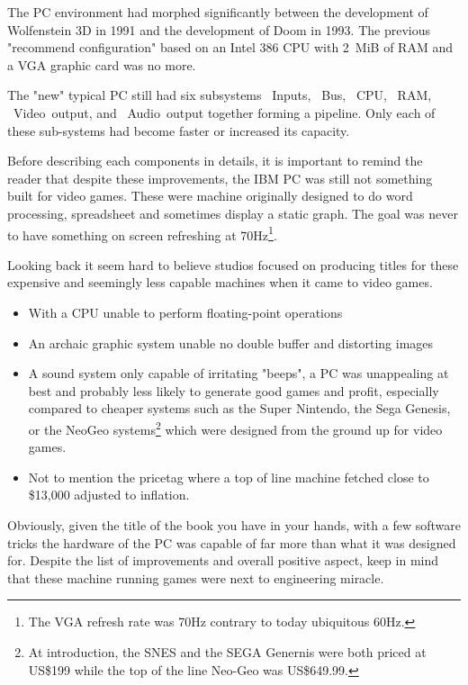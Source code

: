The PC environment had morphed significantly between the development of Wolfenstein 3D in 1991 and the development of Doom in 1993. The previous "recommend configuration" based on an Intel 386 CPU with 2~MiB of RAM and a VGA graphic card was no more.\\
\par
The "new" typical PC still had six subsystems ~Inputs, ~Bus, ~CPU, ~RAM, ~Video~output, and ~Audio~output together forming a pipeline. Only each of these sub-systems had become faster or increased its capacity.\\
\par

\par
 Before describing each components in details, it is important to remind the reader that despite these improvements, the IBM PC was still not something built for video games. These were machine originally designed to do word processing, spreadsheet and sometimes display a static graph. The goal was never to have something on screen refreshing at 70Hz\footnote{The VGA refresh rate was 70Hz contrary to today ubiquitous 60Hz.}.\\ 
\par 
Looking back it seem hard to believe studios focused on producing titles for these expensive and seemingly less capable machines when it came to video games. 
\begin{itemize}
\item With a CPU unable to perform floating-point operations
\item An archaic graphic system unable no double buffer and distorting images
\item A sound system only capable of irritating "beeps", a PC was unappealing at best and probably less likely to generate good games and profit, especially compared to cheaper systems such as the Super Nintendo, the Sega Genesis, or the NeoGeo systems\footnote{At introduction, the SNES and the SEGA Genernis were both priced at US\$199 while the top of the line Neo-Geo was US\$649.99.} which were designed from the ground up for video games.
\item Not to mention the pricetag where a top of line machine fetched close to \$13,000 adjusted to inflation.
\end{itemize}
\par
Obviously, given the title of the book you have in your hands, with a few software tricks the hardware of the PC was capable of far more than what it was designed for. Despite the list of improvements and overall positive aspect, keep in mind that these machine running games were next to engineering miracle.\\
\par


